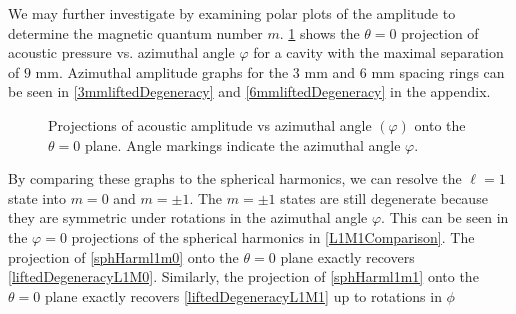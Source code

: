 \documentclass[12pt]{article}
\begin{document}
	We may further investigate by examining polar plots of the amplitude to determine the magnetic quantum number $m$. \cref{9mmPolarliftedDegeneracy} shows the $\theta = 0$ projection of acoustic pressure vs. azimuthal angle $\varphi$ for a cavity with the maximal separation of $9$ mm. Azimuthal amplitude graphs for the $3$ mm and $6$ mm spacing rings can be seen in \cref{3mmliftedDegeneracy} and \cref{6mmliftedDegeneracy} in the appendix.
	
	\begin{figure}[H]
		\centering
		\qquad
		\caption{Projections of acoustic amplitude vs azimuthal angle $(\varphi)$ onto the $\theta=0$ plane. Angle markings indicate the azimuthal angle $\varphi$.}
		\label{9mmPolarliftedDegeneracy}		
	\end{figure}

	By comparing these graphs to the spherical harmonics, we can resolve the $\ell=1$ state into $m=0$ and $m=\pm1$. 
	The $m=\pm1$ states are still degenerate because they are symmetric under rotations in the azimuthal angle $\varphi$. This can be seen in the $\varphi=0$ projections of the spherical harmonics in \cref{L1M1Comparison}. The projection of \cref{sphHarml1m0} onto the $\theta = 0$ plane exactly recovers \cref{liftedDegeneracyL1M0}. Similarly, the projection of \cref{sphHarml1m1} onto the $\theta = 0$ plane exactly recovers \cref{liftedDegeneracyL1M1} up to rotations in $\phi$
\end{document}
